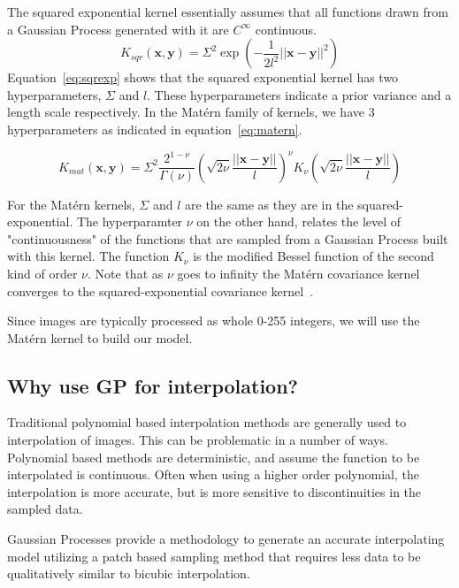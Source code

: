 \documentclass{article}%
\begin{document}
The squared exponential kernel essentially assumes that all functions drawn from a Gaussian Process generated with it 
are $C^\infty$ continuous.  
\begin{equation}
K_{sqr}(\mathbf{x}, \mathbf{y}) = \Sigma^2 \exp{\left(-\frac{1}{2l^2}||\mathbf{x} - \mathbf{y}||^2\right)}
\label{eq:sqrexp}
\end{equation}
Equation~\ref{eq:sqrexp} shows that the squared exponential kernel has two hyperparameters, $\Sigma$ and 
$l$. These hyperparameters indicate a prior variance and a length scale respectively. In the Mat\'{e}rn 
family of kernels, we have 3 hyperparameters as indicated in equation~\ref{eq:matern}.

\begin{equation}
K_{mat}(\mathbf{x}, \mathbf{y}) = \Sigma^2 \frac{2^{1-\nu}}{\Gamma(\nu)}\left(\sqrt{2\nu}
\frac{||\mathbf{x} - \mathbf{y}||}{l}\right)^\nu K_{\nu} \left(\sqrt{2\nu}
\frac{||\mathbf{x} - \mathbf{y}||}{l}\right)
\label{eq:matern}
\end{equation}

For the Mat\'{e}rn kernels, $\Sigma$ and $l$ are the same as they are in the squared-exponential. The 
hyperparamter $\nu$ on the other hand, relates the level of "continuousness" of the functions that are 
sampled from a Gaussian Process built with this kernel. The function $K_\nu$ is the modified Bessel 
function of the second kind of order $\nu$. Note that as $\nu$ goes to infinity the Mat\'{e}rn 
covariance kernel converges to the squared-exponential covariance kernel~\cite{Rasmussen2005}.  

Since images are typically processed as whole 0-255 integers, we will use the Mat\'{e}rn kernel to build our model.

\subsection{Why use GP for interpolation?} 
Traditional polynomial based interpolation methods are generally used to interpolation of images. This can be problematic 
in a number of ways. Polynomial based methods are deterministic, and assume the function to be interpolated is continuous.
Often when using a higher order polynomial, the interpolation is more accurate, but is more sensitive to discontinuities 
in the sampled data. 

Gaussian Processes provide a methodology to generate an accurate interpolating model utilizing a patch based 
sampling method that requires less data to be qualitatively similar to bicubic interpolation. 
\end{document}
